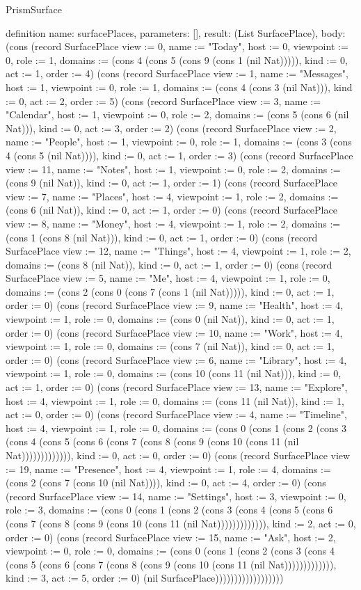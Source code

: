 \begin{lexlean}{PrismSurface}
\begin{semanticmodule}
definition{
  name: surfacePlaces,
  parameters: [],
  result: (List SurfacePlace),
  body: (cons (record SurfacePlace {view := 0, name := "Today", host := 0, viewpoint := 0, role := 1, domains := (cons 4 (cons 5 (cons 9 (cons 1 (nil Nat))))), kind := 0, act := 1, order := 4}) (cons (record SurfacePlace {view := 1, name := "Messages", host := 1, viewpoint := 0, role := 1, domains := (cons 4 (cons 3 (nil Nat))), kind := 0, act := 2, order := 5}) (cons (record SurfacePlace {view := 3, name := "Calendar", host := 1, viewpoint := 0, role := 2, domains := (cons 5 (cons 6 (nil Nat))), kind := 0, act := 3, order := 2}) (cons (record SurfacePlace {view := 2, name := "People", host := 1, viewpoint := 0, role := 1, domains := (cons 3 (cons 4 (cons 5 (nil Nat)))), kind := 0, act := 1, order := 3}) (cons (record SurfacePlace {view := 11, name := "Notes", host := 1, viewpoint := 0, role := 2, domains := (cons 9 (nil Nat)), kind := 0, act := 1, order := 1}) (cons (record SurfacePlace {view := 7, name := "Places", host := 4, viewpoint := 1, role := 2, domains := (cons 6 (nil Nat)), kind := 0, act := 1, order := 0}) (cons (record SurfacePlace {view := 8, name := "Money", host := 4, viewpoint := 1, role := 2, domains := (cons 1 (cons 8 (nil Nat))), kind := 0, act := 1, order := 0}) (cons (record SurfacePlace {view := 12, name := "Things", host := 4, viewpoint := 1, role := 2, domains := (cons 8 (nil Nat)), kind := 0, act := 1, order := 0}) (cons (record SurfacePlace {view := 5, name := "Me", host := 4, viewpoint := 1, role := 0, domains := (cons 2 (cons 0 (cons 7 (cons 1 (nil Nat))))), kind := 0, act := 1, order := 0}) (cons (record SurfacePlace {view := 9, name := "Health", host := 4, viewpoint := 1, role := 0, domains := (cons 0 (nil Nat)), kind := 0, act := 1, order := 0}) (cons (record SurfacePlace {view := 10, name := "Work", host := 4, viewpoint := 1, role := 0, domains := (cons 7 (nil Nat)), kind := 0, act := 1, order := 0}) (cons (record SurfacePlace {view := 6, name := "Library", host := 4, viewpoint := 1, role := 0, domains := (cons 10 (cons 11 (nil Nat))), kind := 0, act := 1, order := 0}) (cons (record SurfacePlace {view := 13, name := "Explore", host := 4, viewpoint := 1, role := 0, domains := (cons 11 (nil Nat)), kind := 1, act := 0, order := 0}) (cons (record SurfacePlace {view := 4, name := "Timeline", host := 4, viewpoint := 1, role := 0, domains := (cons 0 (cons 1 (cons 2 (cons 3 (cons 4 (cons 5 (cons 6 (cons 7 (cons 8 (cons 9 (cons 10 (cons 11 (nil Nat))))))))))))), kind := 0, act := 0, order := 0}) (cons (record SurfacePlace {view := 19, name := "Presence", host := 4, viewpoint := 1, role := 4, domains := (cons 2 (cons 7 (cons 10 (nil Nat)))), kind := 0, act := 4, order := 0}) (cons (record SurfacePlace {view := 14, name := "Settings", host := 3, viewpoint := 0, role := 3, domains := (cons 0 (cons 1 (cons 2 (cons 3 (cons 4 (cons 5 (cons 6 (cons 7 (cons 8 (cons 9 (cons 10 (cons 11 (nil Nat))))))))))))), kind := 2, act := 0, order := 0}) (cons (record SurfacePlace {view := 15, name := "Ask", host := 2, viewpoint := 0, role := 0, domains := (cons 0 (cons 1 (cons 2 (cons 3 (cons 4 (cons 5 (cons 6 (cons 7 (cons 8 (cons 9 (cons 10 (cons 11 (nil Nat))))))))))))), kind := 3, act := 5, order := 0}) (nil SurfacePlace))))))))))))))))))
}
\end{semanticmodule}
\end{lexlean}
